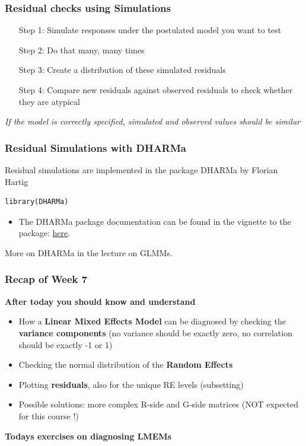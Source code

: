 \documentclass{beamer}
\begin{document}
\begin{frame}[fragile]
    \frametitle{Residual checks using Simulations}
    \begin{itemize}
        \item[Step 1:] Simulate responses under the postulated model you want to test
        \item[Step 2:] Do that many, many times
        \item[Step 3:] Create a distribution of these simulated residuals
        \item[Step 4:] Compare new residuals against observed residuals to check whether they are atypical
    \end{itemize}
    \vspace{0.3cm}

    \textit{If the model is correctly specified, simulated and observed values should be similar}
\end{frame}

\begin{frame}[fragile]
    \frametitle{Residual Simulations with DHARMa}
    Residual simulations are implemented in the package DHARMa by Florian Hartig
    \begin{Verbatim}
library(DHARMa)        
    \end{Verbatim}
    \vspace{0.3cm}
    
    \begin{itemize}
        \item The DHARMa package documentation can be found in the vignette to the package: \href{https://cran.r-project.org/web/packages/DHARMa/vignettes/DHARMa.html}{here}.
    \end{itemize}
    \vspace{0.3cm}
    
    More on DHARMa in the lecture on GLMMs.
\end{frame}

\begin{frame}
    \frametitle{Recap of Week 7}
    \textbf{After today you should know and understand}
    \begin{itemize}
        \item How a \textbf{Linear Mixed Effects Model} can be diagnosed by checking the \textbf{variance components} (no variance should be exactly zero, no correlation should be exactly -1 or 1)
        \item Checking the normal distribution of the \textbf{Random Effects}
        \item Plotting \textbf{residuals}, also for the unique RE levels (subsetting)
        \item Possible solutions: more complex R-side and G-side matrices (NOT expected for this course !)
    \end{itemize}
    \vspace{0.3cm}
    \textbf{Todays exercises on diagnosing LMEMs}
\end{frame}
\end{document}
